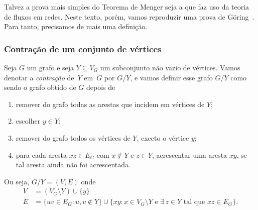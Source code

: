 \documentclass[12pt, a4paper]{article}
\theoremstyle{definition}
\begin{document}
Talvez a prova mais simples do Teorema de Menger seja a que faz uso da teoria de fluxos em redes. Neste texto, porém, vamos reproduzir uma prova de Göring~\cite{Goring}. Para tanto, precisamos de mais uma definição. 

\subsubsection{Contração de um conjunto de vértices}

Seja $G$ um grafo e seja $Y \subseteq V_G$ um subconjunto não vazio de vértices. Vamos denotar a \emph{contração} de~$Y$ em~$G$ por $G/Y$, e vamos definir esse grafo $G/Y$ como sendo o grafo obtido de $G$ depois de
\begin{enumerate}
\item remover do grafo todas as arestas que incidem em vértices de $Y$;
\item \label{contr:step1} escolher $y \in Y$;
\item remover do grafo todos os vértices de $Y$, exceto o vértice $y$; 
\item para cada aresta $xz \in E_G$ com $x \not\in Y$ e $z \in Y$, acrescentar uma aresta $xy$, se tal aresta ainda não foi acrescentada.
\end{enumerate}
Ou seja, $G/Y = (V,E)$ onde
\begin{align*}
  V &= (V_G \setminus Y) \cup \{y\}\\
  E &= \{ uv \in E_G \colon u,v \not\in Y\} \cup \{xy \colon x \in V_G \setminus Y \text{ e } \exists\,z\in Y \text{ tal que }xz \in E_G\}.
\end{align*}
\end{document}
